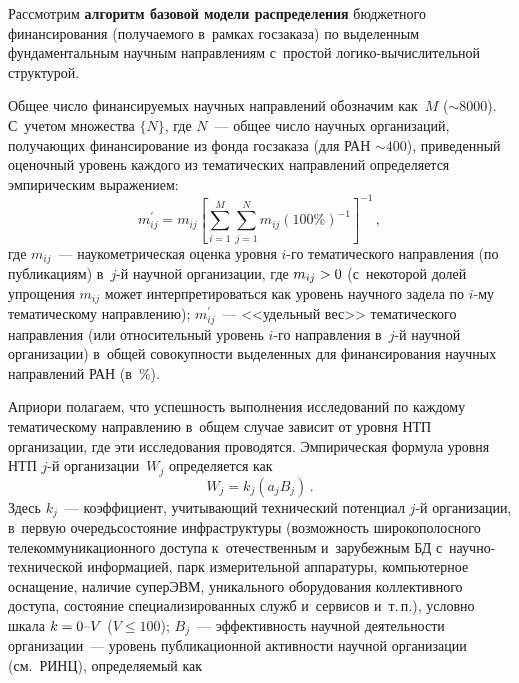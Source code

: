 \begin{multicols}{2}
    Рассмотрим \textbf{алгоритм базовой модели распределения} 
бюджетного финансирования (получаемого в~рамках госзаказа) по выделенным 
фундаментальным научным на\-прав\-ле\-ни\-ям с~прос\-той  
ло\-ги\-ко-вы\-чис\-ли\-тель\-ной структурой. 
    
    Общее число финансируемых научных на\-прав\-ле\-ний обозначим как~$M$ 
($\sim8000$). С~учетом множества $\{N\}$, где $N$~--- общее число научных 
организаций, получающих финансирование из фонда госзаказа (для РАН 
$\sim400$), приведенный оценочный уровень каждого из тематических 
на\-прав\-ле\-ний определяется эмпирическим выражением:
    \begin{equation*}
    m^\prime_{ij}=m_{ij} \left[ \sum\limits_{i=1}^M \sum\limits_{j=1}^N m_{ij} \left( 
100\%\right)^{-1}\right]^{-1}\,,
    \end{equation*}
где $m_{ij}$~--- наукометрическая оценка уровня $i$-го тематического 
направления (по пуб\-ли\-ка\-ци\-ям) в~$j$-й научной организации, где $m_{ij}\hm> 
0$ (с~некоторой долей упрощения $m_{ij}$ может интерпретироваться как 
уровень научного задела по $i$-му тематическому на\-прав\-ле\-нию); 
$m^\prime_{ij}$~--- <<удельный вес>> тематического на\-прав\-ле\-ния (или 
относительный уровень $i$-го направления в~$j$-й научной организации) 
в~общей совокупности выделенных для финансирования научных на\-прав\-ле\-ний 
РАН (в~\%). 
    
    Априори полагаем, что успешность выполнения исследований по каждому 
тематическому на\-прав\-ле\-нию в~общем случае зависит от уровня  
НТП организации, где эти исследования 
проводятся. Эмпирическая формула уровня 
НТП $j$-й организации~$W_j$ определяется как
    \begin{equation}
    W_j=k_j\left(a_j B_j\right)\,.
    \label{e3-sun}
    \end{equation}
Здесь $k_j$~--- коэффициент, учи\-ты\-ва\-ющий технический потенциал $j$-й 
организации, в~первую очередь\linebreak со\-сто\-яние инфраструктуры (возможность 
ши\-ро\-кополосного телекоммуникационного доступа\linebreak
 к~отечественным 
и~зарубежным БД с~на\-уч\-но-тех\-ни\-че\-ской информацией, парк 
измерительной аппаратуры, компьютерное оснащение, наличие супер\-ЭВМ, 
уникального оборудования коллективного доступа, состояние 
специализированных служб и~сервисов и~т.\,п.), условно шкала $k\hm= 0\mbox{--}V$ 
($V\leq 100$);
$B_j$~--- эффективность научной деятельности организации~--- уровень 
пуб\-ли\-ка\-ци\-он\-ной активности научной организации (см.\ РИНЦ), опре\-де\-ля\-емый 
как


\end{multicols}
